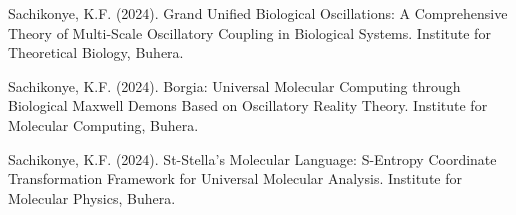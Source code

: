\documentclass[12pt,a4paper]{article}
\begin{document}
\begin{thebibliography}{99}

Sachikonye, K.F. (2024). Grand Unified Biological Oscillations: A Comprehensive Theory of Multi-Scale Oscillatory Coupling in Biological Systems. Institute for Theoretical Biology, Buhera.

Sachikonye, K.F. (2024). Borgia: Universal Molecular Computing through Biological Maxwell Demons Based on Oscillatory Reality Theory. Institute for Molecular Computing, Buhera.

Sachikonye, K.F. (2024). St-Stella's Molecular Language: S-Entropy Coordinate Transformation Framework for Universal Molecular Analysis. Institute for Molecular Physics, Buhera.

\end{thebibliography}
\end{document}
